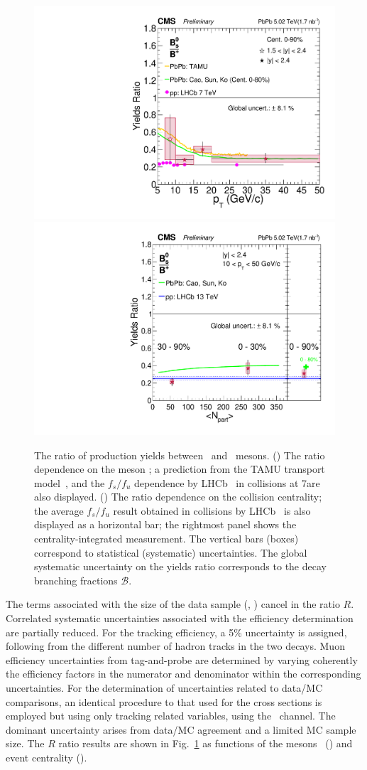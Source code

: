 \begin{figure}[t]
\centering
\includegraphics[width=.48\textwidth]{ratio_bsbu_vsPt.pdf}
\includegraphics[width=.48\textwidth]{ratio_bsbu_vsCent.pdf}
\caption{The ratio of production yields between \PBzs\ and \PBp\ mesons. 
(\cmsLeft) The ratio dependence on the meson \pt; a prediction from the TAMU transport model~\cite{tamu14}, and the $f_s/f_u$ \pt dependence by LHCb~\cite{fsfulhcb2020} in \pp collisions at 7\TeV are also displayed. 
(\cmsRight) The ratio dependence on the collision centrality; 
the average $f_s/f_u$ result obtained in \TeV collisions by LHCb~\cite{fsfulhcb2020} is also displayed as a horizontal bar; 
the rightmost panel shows the centrality-integrated measurement.  
The vertical bars (boxes) correspond to statistical (systematic) uncertainties.
The global systematic uncertainty on the yields ratio corresponds to the decay branching fractions $\mathcal{B}$.}
\label{fig:ratio}
\end{figure}

The terms associated with the size of the data sample (\TAA, \NMB) cancel in the ratio $R$. 
Correlated systematic uncertainties associated with the efficiency determination are partially reduced. 
For the tracking efficiency, a 5\% uncertainty is assigned, following from the different number of hadron tracks in the two decays.
Muon efficiency uncertainties from tag-and-probe are determined by varying coherently the efficiency factors in the numerator and denominator within the corresponding uncertainties. 
For the determination of uncertainties related to data/MC comparisons, an identical procedure to that used for the cross sections is employed but using only tracking related variables, using the \PBp\ channel. 
The dominant uncertainty arises from data/MC agreement and a limited MC sample size. 
%
The $R$ ratio results 
are shown in Fig.~\ref{fig:ratio} 
as functions of the mesons \pt\ (\cmsLeft) and event centrality (\cmsRight).

